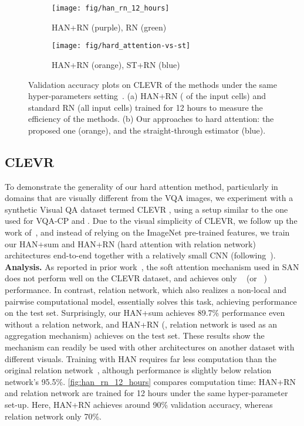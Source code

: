\begin{figure}[!htb]
\begin{center}
\begin{subfigure}{.5\textwidth}
  \centering
  \texttt{[image: fig/han\_rn\_12\_hours]}
  \caption{HAN+RN (purple), RN (green)}
  \label{fig:han_rn_12_hours}
\end{subfigure}\begin{subfigure}{.5\textwidth}
  \centering
  \texttt{[image: fig/hard\_attention-vs-st]}
  \caption{HAN+RN (orange), ST+RN (blue)}
  \label{fig:han_vs_st}
\end{subfigure}\end{center}
\caption{Validation accuracy plots on CLEVR of the methods under the same hyper-parameters setting~\cite{santoro2017simple}. (a)  HAN+RN ( of the input cells)  and standard RN (all input cells) trained for 12 hours to measure the efficiency of the methods. (b) Our approaches to hard attention: the proposed one (orange), and the straight-through estimator (blue). }
\end{figure}



\subsection{CLEVR}
To demonstrate the generality of our hard attention method, particularly in domains that are visually different from the VQA images, 
we experiment with a synthetic Visual QA dataset termed CLEVR \cite{johnson2017clevr}, using a setup similar to the one used for VQA-CP and \cite{santoro2017simple}.  
Due to the visual simplicity of CLEVR, we follow up the work of~\cite{santoro2017simple}, and instead of relying on the ImageNet pre-trained features, we train our HAN+sum and HAN+RN (hard attention with relation network) architectures end-to-end together with a relatively small CNN (following~\cite{santoro2017simple}).
\newline
\noindent \textbf{Analysis.}
As reported in prior work~\cite{santoro2017simple,johnson2017clevr}, the soft attention mechanism used in SAN does not perform well on the CLEVR dataset, and achieves only ~\cite{johnson2017clevr} (or ~\cite{santoro2017simple}) performance. In contrast, relation network, which also realizes a non-local and pairwise computational model, essentially solves this task, achieving  performance on the test set.
Surprisingly, our HAN+sum achieves 
89.7\%
performance even without a relation network, and HAN+RN (\ie, relation network is used as an aggregation mechanism) achieves 
 on the test set.
These results show the mechanism can readily be used with other architectures on another dataset with different visuals. Training with HAN requires far less computation than the original relation network~\cite{santoro2017simple}, although performance is slightly below relation network's 95.5\%. \autoref{fig:han_rn_12_hours} compares computation time: HAN+RN and relation network are trained for 12 hours under the same hyper-parameter set-up. Here, HAN+RN achieves around 90\% validation accuracy, whereas relation network only 70\%.



